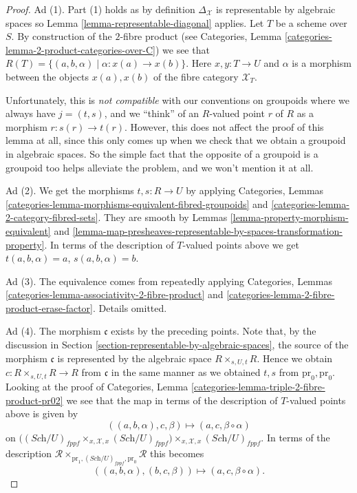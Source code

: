 \begin{proof}
Ad (1). Part (1) holds as by definition $\Delta_{\mathcal{X}}$ is representable
by algebraic spaces so
Lemma \ref{lemma-representable-diagonal}
applies. Let $T$ be a scheme over $S$.
By construction of the $2$-fibre product (see
Categories, Lemma \ref{categories-lemma-2-product-categories-over-C})
we see that $R(T) = \{(a, b, \alpha) \mid \alpha : x(a) \to x(b)\}$.
Here $x, y : T \to U$ and $\alpha$ is a morphism between the objects
$x(a), x(b)$ of the fibre category $\mathcal{X}_T$.

\medskip\noindent
Unfortunately, this is {\it not compatible} with our conventions on
groupoids where we always have $j = (t, s)$, and we ``think'' of an $R$-valued
point $r$ of $R$ as a morphism $r : s(r) \to t(r)$. However, this does
not affect the proof of this lemma at all, since this only comes
up when we check that we obtain a groupoid in algebraic spaces. So the
simple fact that the opposite of a groupoid is a groupoid too helps
alleviate the problem, and we won't mention it at all.

\medskip\noindent
Ad (2). We get the morphisms $t, s : R \to U$ by applying
Categories,
Lemmas \ref{categories-lemma-morphisms-equivalent-fibred-groupoids} and
\ref{categories-lemma-2-category-fibred-sets}.
They are smooth by
Lemmas \ref{lemma-property-morphism-equivalent} and
\ref{lemma-map-presheaves-representable-by-spaces-transformation-property}.
In terms of the description of $T$-valued points above we get
$t(a, b, \alpha) = a$, $s(a, b, \alpha) = b$.

\medskip\noindent
Ad (3). The equivalence comes from repeatedly applying
Categories, Lemmas \ref{categories-lemma-associativity-2-fibre-product} and
\ref{categories-lemma-2-fibre-product-erase-factor}. Details omitted.

\medskip\noindent
Ad (4). The morphism $\mathfrak c$ exists by the preceding points.
Note that, by the discussion in
Section \ref{section-representable-by-algebraic-spaces},
the source of the morphism $\mathfrak c$ is represented by the algebraic
space $R \times_{s, U, t} R$. Hence we obtain
$c : R \times_{s, U, t} R \to R$ from $\mathfrak c$ in the same
manner as we obtained $t, s$ from $\text{pr}_0, \text{pr}_0$.
Looking at the proof of
Categories, Lemma \ref{categories-lemma-triple-2-fibre-product-pr02}
we see that the map in terms of the description of $T$-valued points above
is given by
$$
((a, b, \alpha), c, \beta) \longmapsto (a, c, \beta \circ \alpha)
$$
on
$
\big(
(\textit{Sch}/U)_{fppf} \times_{x, \mathcal{X}, x} (\textit{Sch}/U)_{fppf}
\big)
\times_{x, \mathcal{X}, x} (\textit{Sch}/U)_{fppf}$.
In terms of the description
$\mathcal{R}
\times_{\text{pr}_1, (\textit{Sch}/U)_{fppf}, \text{pr}_0} \mathcal{R}$
this becomes
$$
((a, b, \alpha), (b, c, \beta)) \longmapsto (a, c, \beta \circ \alpha).
$$


\end{proof}
